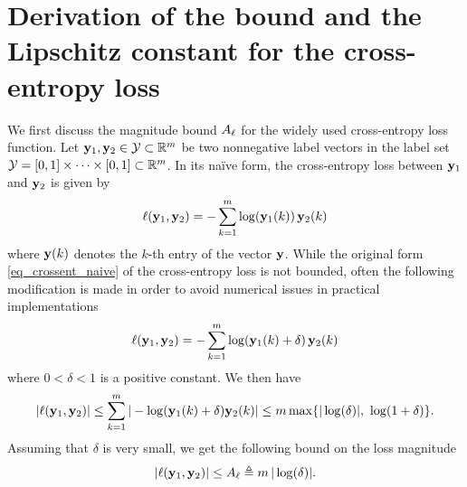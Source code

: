 \documentclass[review,supplement,onefignum,onetabnum]{siamonline250211}
\begin{document}


\section{Derivation of the bound and the Lipschitz constant for the cross-entropy loss}
\label{sec_app_crossent}

We first discuss the magnitude bound $A_\ell$ for the widely used cross-entropy loss function. Let $\mathbf{y}_1, \mathbf{y}_2 \in \mathcal{Y} \subset \mathbb{R}^m$ be two nonnegative label vectors in the label set $\mathcal{Y}=[0,1] \times \cdots \times [0,1] \subset \mathbb{R}^m$. In its na\"ive form, the cross-entropy loss between $\mathbf{y}_1$ and  $\mathbf{y}_2$  is given by
%
\begin{equation}
\label{eq_crossent_naive}
\begin{split}
\ell(\mathbf{y}_1, \mathbf{y}_2) = - \sum_{k=1}^m \log(\mathbf{y}_1(k)) \, \mathbf{y}_2(k)
\end{split}
\end{equation}
%
where $\mathbf{y}(k)$ denotes the $k$-th entry of the vector $\mathbf{y}$. While the original form \eqref{eq_crossent_naive} of the cross-entropy loss is not bounded, often the following modification is made in order to avoid numerical issues in practical implementations
%
\begin{equation*}
\begin{split}
\ell(\mathbf{y}_1, \mathbf{y}_2) = - \sum_{k=1}^m \log(\mathbf{y}_1(k)+\delta) \, \mathbf{y}_2(k)
\end{split}
\end{equation*}
%
where $0<\delta < 1$ is a positive constant. We then have
%
\begin{equation*}
\begin{split}
|\ell(\mathbf{y}_1, \mathbf{y}_2) | \leq \sum_{k=1}^m | - \log(\mathbf{y}_1(k)+ \delta) \mathbf{y}_2(k)  |
\leq m \max\{| \log(\delta) | , \ \log(1+\delta)  \}.
\end{split}
\end{equation*}
%
Assuming that $\delta$ is very small, we get the following bound on the loss magnitude
%
\begin{equation*}
\begin{split}
|\ell(\mathbf{y}_1, \mathbf{y}_2) | \leq A_\ell \triangleq  m \, | \log(\delta) |.
\end{split}
\end{equation*}
\end{document}
